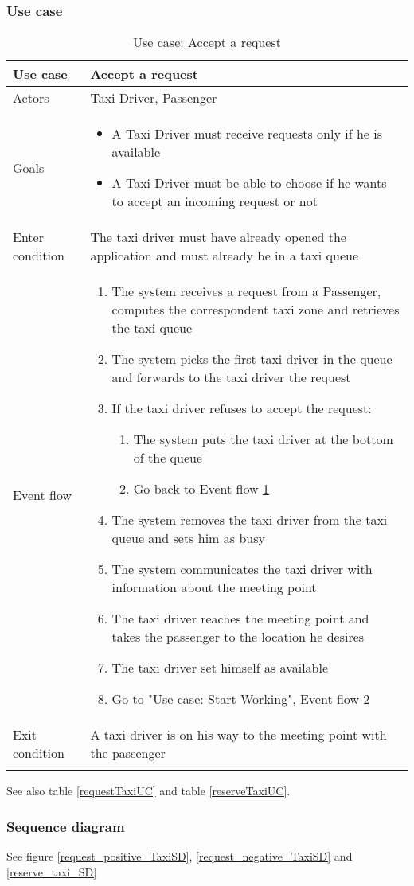 \subsubsection{Use case}
\begin{center}
\centering
\begin{longtable}{| p{} | p{} |} \hline
Use case & \textbf{Accept a request} \\ \hline 
Actors & Taxi Driver, Passenger \\ \hline
Goals & \begin{itemize}
			\item A Taxi Driver must receive requests only if he is available
			\item A Taxi Driver must be able to choose if he wants to accept an incoming request or not
		\end{itemize} \\ \hline
Enter condition & The taxi driver must have already opened the application and must already be in a taxi queue \\ \hline
Event flow & \begin{enumerate}
				\item The system receives a request from a Passenger, computes the correspondent taxi zone and retrieves the taxi queue
				\item The system picks the first taxi driver in the queue \label{firstTaxiDriver} and forwards to the taxi driver the request
				\item If the taxi driver refuses to accept the request:
				\begin{enumerate}
					\item The system puts the taxi driver at the bottom of the queue
					\item Go back to Event flow \ref{firstTaxiDriver}
				\end{enumerate}
				\item The system removes the taxi driver from the taxi queue and sets him as busy
				\item The system communicates the taxi driver with information about the meeting point
				\item The taxi driver reaches the meeting point and takes the passenger to the location he desires
				\item The taxi driver set himself as available
				\item Go to "Use case: Start Working", Event flow 2
			\end{enumerate} \\ \hline
Exit condition & A taxi driver is on his way to the meeting point with the passenger  \\ \hline
\caption{Use case: Accept a request}
\end{longtable}
\end{center}
See also table \ref{requestTaxiUC} and table \ref{reserveTaxiUC}.

\subsubsection{Sequence diagram}
See figure \ref{request_positive_TaxiSD}, \ref{request_negative_TaxiSD} and \ref{reserve_taxi_SD}

